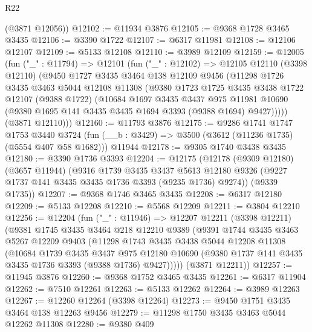\begin{lexlean}{R22}
\begin{coremodule}
      (@3871 @12056))
@12102 := @11934 @3876
@12105 := @9368 @1728 @3465 @3435
@12106 := @3390 @1722
@12107 := @6317 @11981
@12108 := @12106 @12107
@12109 := @5133 @12108
@12110 := @3989 @12109
@12159 := @12005
    (fun ("_" : @11794) =>
    @12101
      (fun ("_" : @12102) =>
      @12105
        @12110
        (@3398 @12110)
        (@9450
          @1727
          @3435
          @3464
          @138
          @12109
          @9456
          (@11298
            @1726
            @3435
            @3463
            @5044
            @12108
            @11308
            (@9380
              @1723
              @1725
              @3435
              @3438
              @1722
              @12107
              (@9388 @1722)
              (@10684
                @1697
                @3435
                @3437
                @975
                @11981
                @10690
                (@9380 @1695 @141 @3435 @3435 @1694 @3393 (@9388 @1694) @9427)))))
        (@3871 @12110)))
@12160 := @11793 @3876
@12175 := @9286
    @1741
    @1747
    @1753
    @3440
    @3724
    (fun (__b : @3429) => @3500 (@3612 (@11236 @1735) (@5554 @407 @58 @1682)))
    @11944
@12178 := @9305 @1740 @3438 @3435
@12180 := @3390 @1736 @3393
@12204 := @12175
    (@12178
      (@9309 @12180)
      (@3657 @11944)
      (@9316
        @1739
        @3435
        @3437
        @5613
        @12180
        @9326
        (@9227 @1737 @141 @3435 @3435 @1736 @3393 (@9235 @1736) @9274))
      (@9339 @1735))
@12207 := @9368 @1746 @3465 @3435
@12208 := @6317 @12180
@12209 := @5133 @12208
@12210 := @5568 @12209
@12211 := @3804 @12210
@12256 := @12204
    (fun ("_" : @11946) =>
    @12207
      @12211
      (@3398 @12211)
      (@9381
        @1745
        @3435
        @3464
        @218
        @12210
        @9389
        (@9391
          @1744
          @3435
          @3463
          @5267
          @12209
          @9403
          (@11298
            @1743
            @3435
            @3438
            @5044
            @12208
            @11308
            (@10684
              @1739
              @3435
              @3437
              @975
              @12180
              @10690
              (@9380 @1737 @141 @3435 @3435 @1736 @3393 (@9388 @1736) @9427)))))
      (@3871 @12211))
@12257 := @11945 @3876
@12260 := @9368 @1752 @3465 @3435
@12261 := @6317 @11904
@12262 := @7510 @12261
@12263 := @5133 @12262
@12264 := @3989 @12263
@12267 := @12260 @12264 (@3398 @12264)
@12273 := @9450 @1751 @3435 @3464 @138 @12263 @9456
@12279 := @11298 @1750 @3435 @3463 @5044 @12262 @11308
@12280 := @9380 @409

\end{coremodule}
\end{lexlean}
